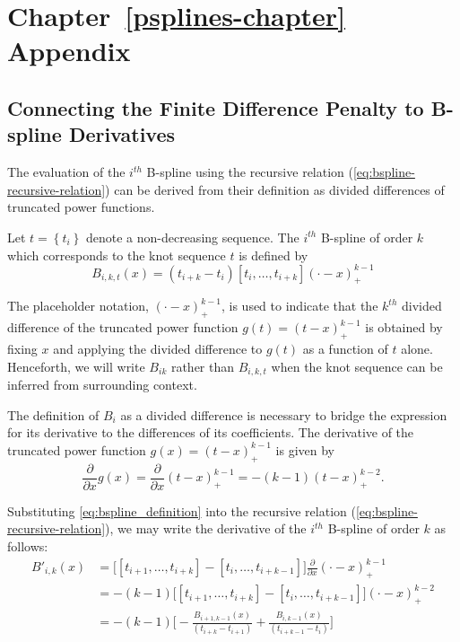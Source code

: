 \chapter{Chapter~\ref{psplines-chapter} Appendix} \label{psplines-appendix}

\section{Connecting the Finite Difference Penalty to B-spline Derivatives}

The evaluation of the $i^{th}$ B-spline using the recursive relation (\ref{eq:bspline-recursive-relation}) can be derived from their definition as divided differences of truncated power functions.  

\begin{definition} \label{definition:order_k_Bspline}
Let $t= \left\{ t_i \right\}$ denote a non-decreasing sequence. The $i^{th}$ B-spline of order $k$ which corresponds to the knot sequence $t$ is defined by 
\begin{equation} \label{eq:bspline_definition}
B_{i,k,t}\left(x\right) = \left(t_{i+k}-t_i\right)\left[t_i,\dots,t_{i+k}\right]\left(\cdot -x\right)_+^{k-1}
\end{equation}
\end{definition}

The placeholder notation, $\left(\cdot - x\right)_+^{k-1}$, is used to indicate that the $k^{th}$ divided difference of the truncated power function $g\left(t \right) = \left(t-x\right)^{k-1}_+$ is obtained by fixing $x$ and applying the divided difference to $g\left(t \right)$ as a function of $t$ alone. Henceforth, we will write $B_{ik}$ rather than $B_{i,k,t}$ when the knot sequence can be inferred from surrounding context.

\bigskip

The definition of $B_i$ as a divided difference is necessary to bridge the expression for its derivative to the differences of its coefficients. The derivative of the truncated power function $g\left(x\right) = \left(t-x\right)_+^{k-1}$ is given by 
\[
\frac{\partial}{\partial x}g\left(x\right) = \frac{\partial}{\partial x} \left(t-x\right)_+^{k-1} = -\left(k-1\right)\left(t-x\right)_+^{k-2}.
\]

\noindent
Substituting \ref{eq:bspline_definition} into the recursive relation (\ref{eq:bspline-recursive-relation}), we may write the derivative of the $i^{th}$ B-spline of order $k$ as follows:
\begin{align*}
 B'_{i,k}\left(x\right) &= \bigg[ \left[ t_{i+1},\dots,t_{i+k} \right] -\left[ t_{i},\dots,t_{i+k-1} \right] \bigg] \frac{\partial}{\partial x} \left(\cdot - x\right)_+^{k-1}\\
&= -\left(k-1\right) \bigg[ \left[ t_{i+1},\dots,t_{i+k} \right] -\left[ t_{i},\dots,t_{i+k-1} \right] \bigg] \left( \cdot - x \right)^{k-2}_+ \\
&= -\left(k-1\right) \bigg[ -\frac{B_{i+1,k-1}\left(x\right)}{\left(t_{i+k} - t_{i+1} \right)}  + \frac{B_{i,k-1}\left(x\right)}{\left(t_{i+k-1} - t_{i} \right)} \bigg]  
\end{align*}

